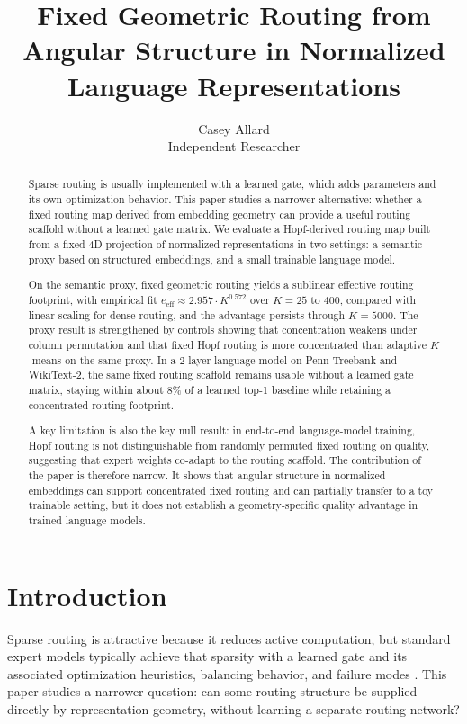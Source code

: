 \documentclass[10pt,twocolumn,letterpaper]{article}
\title{\textbf{Fixed Geometric Routing from Angular Structure in Normalized Language Representations}}
\author{Casey Allard\\Independent Researcher}
\date{}
\begin{document}
\maketitle

\begin{abstract}
Sparse routing is usually implemented with a learned gate, which adds parameters and its own optimization behavior. This paper studies a narrower alternative: whether a fixed routing map derived from embedding geometry can provide a useful routing scaffold without a learned gate matrix. We evaluate a Hopf-derived routing map built from a fixed 4D projection of normalized representations in two settings: a semantic proxy based on structured embeddings, and a small trainable language model.

On the semantic proxy, fixed geometric routing yields a sublinear effective routing footprint, with empirical fit \(e_{\mathrm{eff}} \approx 2.957 \cdot K^{0.572}\) over \(K=25\) to \(400\), compared with linear scaling for dense routing, and the advantage persists through \(K=5000\). The proxy result is strengthened by controls showing that concentration weakens under column permutation and that fixed Hopf routing is more concentrated than adaptive \(K\)-means on the same proxy. In a 2-layer language model on Penn Treebank and WikiText-2, the same fixed routing scaffold remains usable without a learned gate matrix, staying within about \(8\%\) of a learned top-1 baseline while retaining a concentrated routing footprint.

A key limitation is also the key null result: in end-to-end language-model training, Hopf routing is not distinguishable from randomly permuted fixed routing on quality, suggesting that expert weights co-adapt to the routing scaffold. The contribution of the paper is therefore narrow. It shows that angular structure in normalized embeddings can support concentrated fixed routing and can partially transfer to a toy trainable setting, but it does not establish a geometry-specific quality advantage in trained language models.
\end{abstract}

\section{Introduction}
Sparse routing is attractive because it reduces active computation, but standard expert models typically achieve that sparsity with a learned gate and its associated optimization heuristics, balancing behavior, and failure modes \citep{shazeer2017outrageously,fedus2022switch}. This paper studies a narrower question: can some routing structure be supplied directly by representation geometry, without learning a separate routing network?
\end{document}
